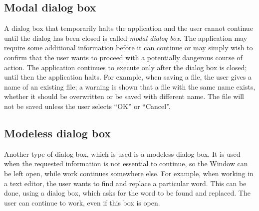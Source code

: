 \subsection{Modal dialog box}
A dialog box that temporarily halts the application and the user cannot continue until the dialog has been closed is called \textit{modal dialog box}. The application may require some additional information
before it can continue or may simply wish to confirm that the user wants to proceed with a
potentially dangerous course of action. The application continues to execute only after the dialog
box is closed; until then the application halts. For example, when saving a file, the user gives a
name of an existing file; a warning is shown that a file with the same name exists, whether it should
be overwritten or be saved with different name. The file will not be saved unless the user selects
“OK” or “Cancel”.

\subsection{Modeless dialog box}
Another type of dialog box, which is used is a modeless dialog box. It is used when the requested
information is not essential to continue, so the Window can be left open, while work continues
somewhere else. For example, when working in a text editor, the user wants to find and replace a
particular word. This can be done, using a dialog box, which asks for the word to be found and
replaced. The user can continue to work, even if this box is open.

